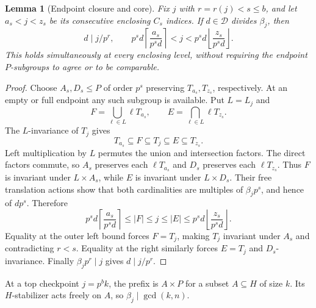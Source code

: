 \documentclass[11pt,letterpaper]{article}
\newtheorem{lemma}[theorem]{Lemma}
\theoremstyle{definition}\newtheorem{definition}{Definition}
\newcommand{\D}{\mathcal D}
\begin{document}
\begin{lemma}[Endpoint closure and core]\label{lem:closure}
Fix $j$ with $r=r(j)<s\le b$, and let $a_s<j<z_s$ be its consecutive enclosing $C_s$ indices. If $d\in\D$ divides $\beta_j$, then
\begin{equation}
d\mid j/p^r,\qquad
p^sd\left\lceil\frac{a_s}{p^sd}\right\rceil<j
 <p^sd\left\lfloor\frac{z_s}{p^sd}\right\rfloor.\label{eq:clips}
\end{equation}
This holds simultaneously at every enclosing level, without requiring the endpoint $P$-subgroups to agree or to be comparable.
\end{lemma}
\begin{proof}
Choose $A_s,D_s\le P$ of order $p^s$ preserving $T_{a_s},T_{z_s}$, respectively. At an empty or full endpoint any such subgroup is available. Put $L=L_j$ and
\[
F=\bigcup_{\ell\in L}\ell T_{a_s},\qquad
E=\bigcap_{\ell\in L}\ell T_{z_s}.
\]
The $L$-invariance of $T_j$ gives
\[
T_{a_s}\subseteq F\subseteq T_j\subseteq E\subseteq T_{z_s}.
\]
Left multiplication by $L$ permutes the union and intersection factors. The direct factors commute, so $A_s$ preserves each $\ell T_{a_s}$ and $D_s$ preserves each $\ell T_{z_s}$. Thus $F$ is invariant under $L\times A_s$, while $E$ is invariant under $L\times D_s$. Their free translation actions show that both cardinalities are multiples of $\beta_jp^s$, and hence of $dp^s$. Therefore
\[
p^sd\left\lceil\frac{a_s}{p^sd}\right\rceil
\le |F|\le j\le |E|
\le p^sd\left\lfloor\frac{z_s}{p^sd}\right\rfloor.
\]
Equality at the outer left bound forces $F=T_j$, making $T_j$ invariant under $A_s$ and contradicting $r<s$. Equality at the right similarly forces $E=T_j$ and $D_s$-invariance. Finally $\beta_jp^r\mid j$ gives $d\mid j/p^r$.
\end{proof}

At a top checkpoint $j=p^bk$, the prefix is $A\times P$ for a subset $A\subseteq H$ of size $k$. Its $H$-stabilizer acts freely on $A$, so $\beta_j\mid\gcd(k,n)$.
\end{document}
